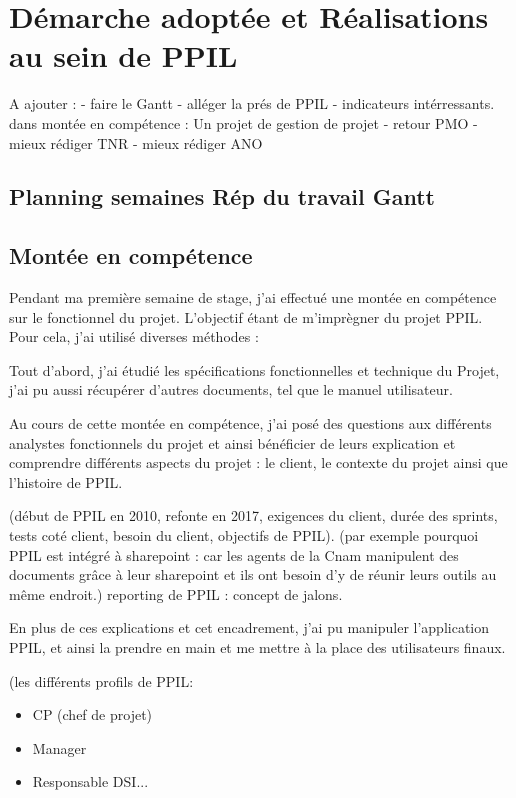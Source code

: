 \chapter{Démarche adoptée et Réalisations au sein de PPIL}
\label{chap:premierchapitre}

A ajouter : 
- faire le Gantt
- alléger la prés de PPIL
- indicateurs intérressants. dans montée en compétence : Un projet de gestion de projet
- retour PMO
-mieux rédiger TNR
- mieux rédiger ANO





\section{Planning semaines Rép du travail Gantt}
\section{Montée en compétence}
Pendant ma première semaine de stage, j'ai effectué une montée en compétence sur le fonctionnel du projet. L'objectif étant de m'imprègner du projet PPIL. Pour cela, j'ai utilisé diverses méthodes :

Tout d'abord, j'ai étudié les spécifications fonctionnelles et technique du Projet, j'ai pu aussi récupérer d'autres documents, tel que le manuel utilisateur.

Au cours de cette montée en compétence, j'ai posé des questions aux différents analystes fonctionnels du projet et ainsi bénéficier de leurs explication et comprendre différents aspects du projet : le client, le contexte du projet ainsi que l'histoire de PPIL. 

(début de PPIL en 2010, refonte en 2017, exigences du client, durée des sprints, tests coté client, besoin du client, objectifs de PPIL). 
(par exemple pourquoi PPIL est intégré à sharepoint : car les agents de la Cnam manipulent des documents grâce à leur sharepoint et ils ont besoin d'y de réunir leurs outils au même endroit.)
reporting de PPIL : concept de jalons.

En plus de ces explications et cet encadrement, j'ai pu manipuler l'application PPIL, et ainsi la prendre en main et me mettre à la place des utilisateurs finaux. 

(les différents profils de PPIL:
\begin{itemize}
    \item CP (chef de projet) 
    \item Manager
    \item Responsable DSI...
\end{itemize}


